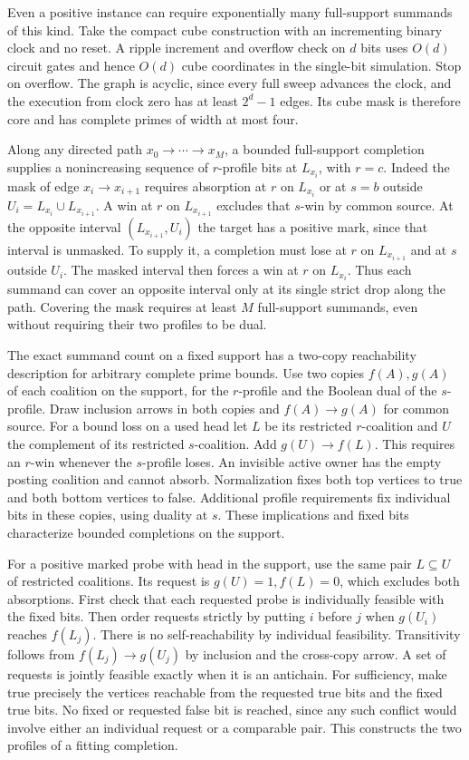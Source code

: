 Even a positive instance can require exponentially many
full-support summands of this kind. Take the compact
cube construction with an incrementing binary clock
and no reset. A ripple increment and overflow check
on $d$ bits uses $O(d)$ circuit gates and hence $O(d)$
cube coordinates in the single-bit simulation. Stop on
overflow. The graph is acyclic, since every full sweep
advances the clock, and the execution from clock zero
has at least $2^d-1$ edges. Its cube mask is therefore
core and has complete primes of width at most four.

Along any directed path $x_0\to\cdots\to x_M$, a
bounded full-support completion supplies a nonincreasing
sequence of $r$-profile bits at $L_{x_i}$, with $r=c$.
Indeed the mask of edge $x_i\to x_{i+1}$ requires
absorption at $r$ on $L_{x_i}$ or at $s=b$ outside
$U_i=L_{x_i}\cup L_{x_{i+1}}$. A win at $r$ on
$L_{x_{i+1}}$ excludes that $s$-win by common source.
At the opposite interval $(L_{x_{i+1}},U_i)$ the
target has a positive mark, since that interval is
unmasked. To supply it, a completion must lose at
$r$ on $L_{x_{i+1}}$ and at $s$ outside $U_i$.
The masked interval then forces a win at $r$ on
$L_{x_i}$. Thus each summand can cover an opposite
interval only at its single strict drop along the
path. Covering the mask requires at least $M$
full-support summands, even without requiring their
two profiles to be dual.

The exact summand count on a fixed support has a
two-copy reachability description for arbitrary
complete prime bounds. Use two copies $f(A),g(A)$
of each coalition on the support, for the $r$-profile
and the Boolean dual of the $s$-profile. Draw
inclusion arrows in both copies and $f(A)\to g(A)$
for common source. For a bound loss on a used head
let $L$ be its restricted $r$-coalition and $U$ the
complement of its restricted $s$-coalition. Add
$g(U)\to f(L)$. This requires an $r$-win whenever
the $s$-profile loses. An invisible active owner
has the empty posting coalition and cannot absorb.
Normalization fixes both top vertices to true and
both bottom vertices to false. Additional profile
requirements fix individual bits in these copies,
using duality at $s$. These implications and fixed
bits characterize bounded completions on the support.

For a positive marked probe with head in the support,
use the same pair $L\subseteq U$ of restricted
coalitions. Its request is $g(U)=1,f(L)=0$, which
excludes both absorptions. First check that each
requested probe is individually feasible with the
fixed bits. Then order requests strictly by putting
$i$ before $j$ when $g(U_i)$ reaches $f(L_j)$.
There is no self-reachability by individual
feasibility. Transitivity follows from
$f(L_j)\to g(U_j)$ by inclusion and the cross-copy
arrow. A set of requests is jointly feasible exactly
when it is an antichain. For sufficiency, make true
precisely the vertices reachable from the requested
true bits and the fixed true bits. No fixed or
requested false bit is reached, since any such
conflict would involve either an individual request
or a comparable pair. This constructs the two
profiles of a fitting completion.

